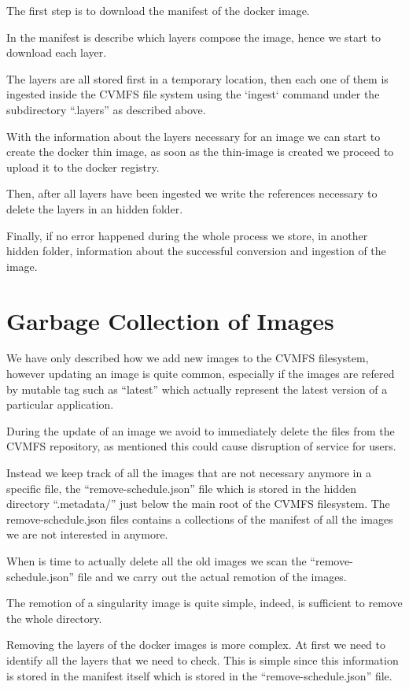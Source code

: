 The first step is to download the manifest of the docker image.

In the manifest is describe which layers compose the image, hence we start to
download each layer.

The layers are all stored first in a temporary location, then each one of them
is ingested inside the CVMFS file system using the `ingest` command under the
subdirectory “.layers” as described above.

With the information about the layers necessary for an image we can start to
create the docker thin image, as soon as the thin-image is created we proceed
to upload it to the docker registry.

Then, after all layers have been ingested we write the references necessary to
delete the layers in an hidden folder.

Finally, if no error happened during the whole process we store, in another
hidden folder, information about the successful conversion and ingestion of the
image.

\section{Garbage Collection of Images}

We have only described how we add new images to the CVMFS filesystem, however
updating an image is quite common, especially if the images are refered by
mutable tag such as “latest” which actually represent the latest version of a
particular application.

During the update of an image we avoid to immediately delete the files from the
CVMFS repository, as mentioned this could cause disruption of service for
users.

Instead we keep track of all the images that are not necessary anymore in a
specific file, the “remove-schedule.json” file which is stored in the hidden
directory “.metadata/” just below the main root of the CVMFS filesystem. The
remove-schedule.json files contains a collections of the manifest of all the
images we are not interested in anymore.

When is time to actually delete all the old images we scan the
“remove-schedule.json” file and we carry out the actual remotion of the images. 

The remotion of a singularity image is quite simple, indeed, is sufficient to
remove the whole directory.

Removing the layers of the docker images is more complex. At first we need to
identify all the layers that we need to check. This is simple since this
information is stored in the manifest itself which is stored in the
“remove-schedule.json” file.


